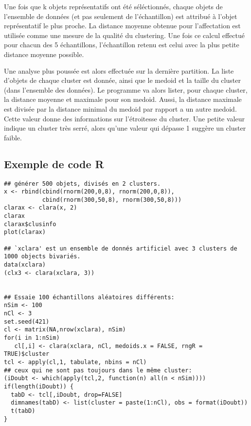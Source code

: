 \documentclass[report]{subfiles}
\begin{document}
Une fois que k objets représentatifs ont été séléctionnés, chaque objets de l'ensemble de données (et pas seulement de l'échantillon) est attribué à l'objet représentatif le plus proche. La distance moyenne obtenue pour l'affectation est utilisée comme une mesure de la qualité du clustering. Une fois ce calcul effectué pour chacun des 5 échantillons, l'échantillon retenu est celui avec la plus petite distance moyenne possible.

Une analyse plus poussée est alors effectuée sur la dernière partition. La liste d'objets de chaque cluster est donnée, ainsi que le medoid et la taille du cluster (dans l'ensemble des données). Le programme va alors lister, pour chaque cluster, la distance moyenne et maximale pour son medoid. Aussi, la distance maximale est divisée par la distance minimal du medoid par rapport a un autre medoid. Cette valeur donne des informations sur l'étroitesse du cluster. Une petite valeur indique un cluster très serré, alors qu'une valeur qui dépasse 1 suggère un cluster faible.

\subsection{Exemple de code R} %
\begin{verbatim}
## générer 500 objets, divisés en 2 clusters.
x <- rbind(cbind(rnorm(200,0,8), rnorm(200,0,8)),
           cbind(rnorm(300,50,8), rnorm(300,50,8)))
clarax <- clara(x, 2)
clarax
clarax$clusinfo
plot(clarax)

## `xclara' est un ensemble de donnés artificiel avec 3 clusters de 1000 objects bivariés.
data(xclara)
(clx3 <- clara(xclara, 3))


## Essaie 100 échantillons aléatoires différents:
nSim <- 100
nCl <- 3 
set.seed(421)
cl <- matrix(NA,nrow(xclara), nSim)
for(i in 1:nSim)
   cl[,i] <- clara(xclara, nCl, medoids.x = FALSE, rngR = TRUE)$cluster
tcl <- apply(cl,1, tabulate, nbins = nCl)
## ceux qui ne sont pas toujours dans le même cluster:
(iDoubt <- which(apply(tcl,2, function(n) all(n < nSim))))
if(length(iDoubt)) {
  tabD <- tcl[,iDoubt, drop=FALSE]
  dimnames(tabD) <- list(cluster = paste(1:nCl), obs = format(iDoubt))
  t(tabD)
}
\end{verbatim}
\end{document}
